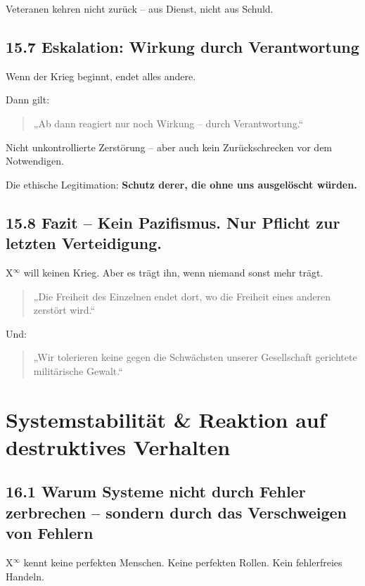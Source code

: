 \documentclass[12pt,a4paper]{book}
\begin{document}
Veteranen kehren nicht zurück – aus Dienst, nicht aus Schuld.

\section*{15.7 Eskalation: Wirkung durch Verantwortung}

Wenn der Krieg beginnt,  
endet alles andere.

Dann gilt:

\begin{quote}
„Ab dann reagiert nur noch Wirkung – durch Verantwortung.“  
\end{quote}

Nicht unkontrollierte Zerstörung –  
aber auch kein Zurückschrecken vor dem Notwendigen.

Die ethische Legitimation:  
\textbf{Schutz derer, die ohne uns ausgelöscht würden.}

\section*{15.8 Fazit – Kein Pazifismus. Nur Pflicht zur letzten Verteidigung.}

X$^\infty$ will keinen Krieg.  
Aber es trägt ihn, wenn niemand sonst mehr trägt.

\begin{quote}
„Die Freiheit des Einzelnen endet dort,  
wo die Freiheit eines anderen zerstört wird.“  
\end{quote}

Und:

\begin{quote}
„Wir tolerieren keine gegen die Schwächsten unserer Gesellschaft gerichtete militärische Gewalt.“  
\end{quote}

\chapter{Systemstabilität \& Reaktion auf destruktives Verhalten}

\section*{16.1 Warum Systeme nicht durch Fehler zerbrechen – sondern durch das Verschweigen von Fehlern}

X$^\infty$ kennt keine perfekten Menschen.  
Keine perfekten Rollen. Kein fehlerfreies Handeln.
\end{document}
